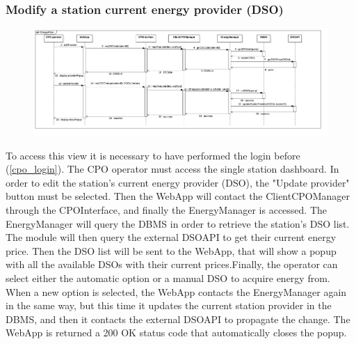 \subsubsection{Modify a station current energy provider (DSO)}
\begin{figure}[H]
    \begin{center}
        \includegraphics[width=\textwidth]{img/runtime/cpo_dso}
    \end{center}
\end{figure}
To access this view it is necessary to have performed the login before (\ref{cpo_login}). The CPO operator must access the single station dashboard. In order to edit the station's current energy provider (DSO), the "Update provider" button must be selected. Then the WebApp will contact the ClientCPOManager through the CPOInterface, and finally the EnergyManager is accessed. The EnergyManager will query the DBMS in order to retrieve the station's DSO list. The module will then query the external DSOAPI to get their current energy price. Then the DSO list will be sent to the WebApp, that will show a popup with all the available DSOs with their current prices.Finally, the operator can select either the automatic option or a manual DSO to acquire energy from. When a new option is selected, the WebApp contacts the EnergyManager again in the same way, but this time it updates the current station provider in the DBMS, and then it contacts the external DSOAPI to propagate the change.
The WebApp is returned a 200 OK status code that automatically closes the popup.
